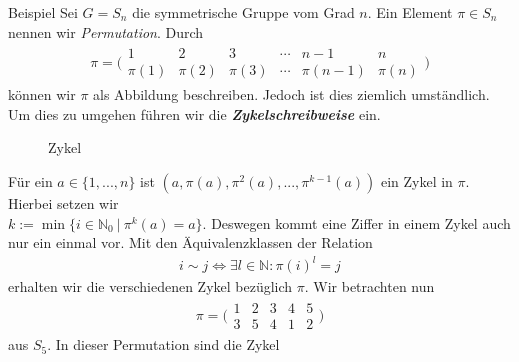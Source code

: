 \begin{genericdf}{Beispiel}
Sei $G = S_n$ die symmetrische Gruppe vom Grad $n$.
Ein Element $\pi \in S_n$ nennen wir \textit{Permutation}.
Durch
\begin{align*}
 \pi = \bigl(\begin{smallmatrix}
    1 & 2 & 3 & \cdots & n-1 & n \\
    \pi(1) & \pi(2) & \pi(3) & \cdots &  \pi(n-1)  & \pi(n)
  \end{smallmatrix}\bigr)
\end{align*}
können wir $\pi$ als Abbildung beschreiben. Jedoch ist dies ziemlich umständlich.
Um dies zu umgehen führen wir die \textbf{\textit{Zykelschreibweise}} ein.
\begin{figure}[H]
  \centering
\caption{Zykel}
\end{figure}
Für ein $a \in \lbrace 1,...,n \rbrace$ ist $(a , \pi(a), \pi^2(a),...,\pi^{k-1}(a) )$ ein Zykel in $\pi$.
Hierbei setzen wir \\ 
$k := \min\lbrace i \in \mathbb{N}_0 \ | \ \pi^k(a) = a \rbrace$. Deswegen kommt eine Ziffer in einem Zykel auch nur ein einmal vor.
Mit den Äquivalenzklassen der Relation 
\begin{align*}
i \sim j \Leftrightarrow  \exists l \in \mathbb{N} : \pi(i)^l = j
\end{align*}
erhalten wir die verschiedenen Zykel bezüglich $\pi$.
Wir betrachten nun 
\begin{align*}
\pi = \bigl(\begin{smallmatrix}
    1 & 2 & 3 & 4 & 5  \\
    3 & 5 & 4 & 1 &  2  
  \end{smallmatrix}\bigr)
\end{align*}
aus $S_5$. In dieser Permutation sind die Zykel
\begin{figure}[H]
  \centering
\end{figure}
\end{genericdf}
